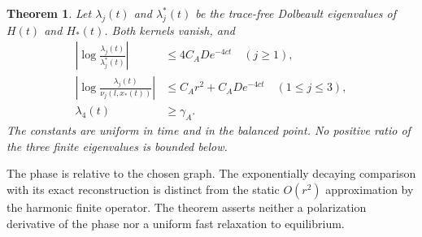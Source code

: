\documentclass[11pt]{amsart}
\newtheorem{theorem}{Theorem}[section]
\theoremstyle{definition}
\theoremstyle{remark}
\begin{document}
\begin{theorem}
Let $\lambda_j(t)$ and $\lambda_j^*(t)$ be the trace-free
Dolbeault eigenvalues of $H(t)$ and $H_*(t)$. Both kernels vanish,
and
\begin{equation}\label{eq:phase-spectra}
 \begin{aligned}
 \left|\log\frac{\lambda_j(t)}{\lambda_j^*(t)}\right|
       &\le4C_AD e^{-4ct}\quad(j\ge1),\\
 \left|\log\frac{\lambda_j(t)}{\nu_j(l,x_*(t))}\right|
       &\le C_Ar^2+C_AD e^{-4ct}\quad(1\le j\le3),\\
 \lambda_4(t)&\ge\gamma_A.
 \end{aligned}
\end{equation}
The constants are uniform in time and in the balanced point.
No positive ratio of the three finite eigenvalues is bounded below.
\end{theorem}

The phase is relative to the chosen graph. The exponentially
decaying comparison with its exact reconstruction is distinct
from the static $O(r^2)$ approximation by the harmonic finite
operator. The theorem asserts neither a polarization derivative
of the phase nor a uniform fast relaxation to equilibrium.
\end{document}
